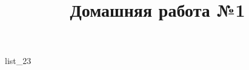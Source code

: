 \documentclass[12pt, a4paper]{article}
\begin{document}
	\title{Домашняя работа №1}
	{list_23}
\end{document}
